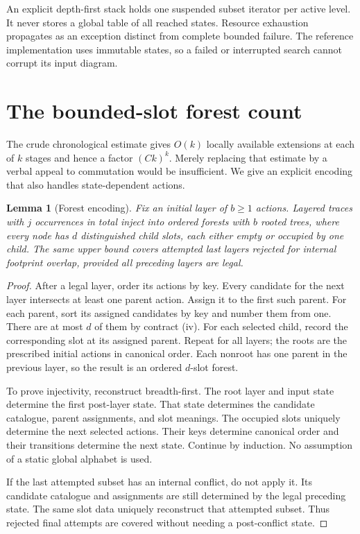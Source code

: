\documentclass[11pt]{article}
\newtheorem{lemma}[theorem]{Lemma}
\theoremstyle{definition}
\begin{document}
An explicit depth-first stack holds one suspended subset iterator per
active level. It never stores a global table of all reached states.
Resource exhaustion propagates as an exception distinct from complete
bounded failure. The reference implementation uses immutable states, so a
failed or interrupted search cannot corrupt its input diagram.

\section{The bounded-slot forest count}
\label{sec:forests}

The crude chronological estimate gives $O(k)$ locally available extensions
at each of $k$ stages and hence a factor $(Ck)^k$. Merely replacing that
estimate by a verbal appeal to commutation would be insufficient. We give
an explicit encoding that also handles state-dependent actions.

\begin{lemma}[Forest encoding]
\label{lem:encoding}
Fix an initial layer of $b\ge1$ actions. Layered traces with $j$ occurrences
in total inject into ordered forests with $b$ rooted trees, where every
node has $d$ distinguished child slots, each either empty or occupied by
one child. The same upper bound covers attempted last layers rejected for
internal footprint overlap, provided all preceding layers are legal.
\end{lemma}

\begin{proof}
After a legal layer, order its actions by key. Every candidate for the next
layer intersects at least one parent action. Assign it to the first such
parent. For each parent, sort its assigned candidates by key and number
them from one. There are at most $d$ of them by contract (iv). For each
selected child, record the corresponding slot at its assigned parent.
Repeat for all layers; the roots are the prescribed initial actions in
canonical order. Each nonroot has one parent in the previous layer, so the
result is an ordered $d$-slot forest.

To prove injectivity, reconstruct breadth-first. The root layer and input
state determine the first post-layer state. That state determines the
candidate catalogue, parent assignments, and slot meanings. The occupied
slots uniquely determine the next selected actions. Their keys determine
canonical order and their transitions determine the next state. Continue
by induction. No assumption of a static global alphabet is used.

If the last attempted subset has an internal conflict, do not apply it.
Its candidate catalogue and assignments are still determined by the legal
preceding state. The same slot data uniquely reconstruct that attempted
subset. Thus rejected final attempts are covered without needing a
post-conflict state.
\end{proof}
\end{document}
